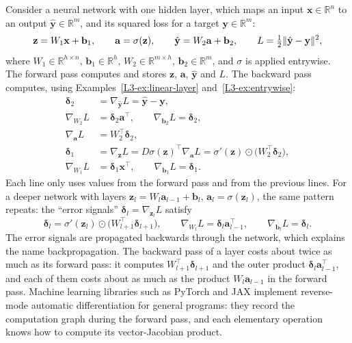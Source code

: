 Consider a neural network with one hidden layer, which maps an input $\mathbf{x} \in \mathbb{R}^n$ to an output $\hat{\mathbf{y}} \in \mathbb{R}^m$, and its squared loss for a target $\mathbf{y} \in \mathbb{R}^m$:
\[\mathbf{z} = W_1 \mathbf{x} + \mathbf{b}_1, \qquad \mathbf{a} = \sigma(\mathbf{z}), \qquad \hat{\mathbf{y}} = W_2 \mathbf{a} + \mathbf{b}_2, \qquad L = \tfrac{1}{2}\lVert \hat{\mathbf{y}} - \mathbf{y} \rVert^2,\]
where $W_1 \in \mathbb{R}^{h \times n}$, $\mathbf{b}_1 \in \mathbb{R}^h$, $W_2 \in \mathbb{R}^{m \times h}$, $\mathbf{b}_2 \in \mathbb{R}^m$, and $\sigma$ is applied entrywise. The forward pass computes and stores $\mathbf{z}$, $\mathbf{a}$, $\hat{\mathbf{y}}$ and $L$. The backward pass computes, using Examples~\ref{L3-ex:linear-layer} and~\ref{L3-ex:entrywise}:
\begin{align*}
    \boldsymbol{\delta}_2 &= \nabla_{\hat{\mathbf{y}}} L = \hat{\mathbf{y}} - \mathbf{y}, \\
    \nabla_{W_2} L &= \boldsymbol{\delta}_2 \mathbf{a}^\top, \qquad \nabla_{\mathbf{b}_2} L = \boldsymbol{\delta}_2, \\
    \nabla_{\mathbf{a}} L &= W_2^\top \boldsymbol{\delta}_2, \\
    \boldsymbol{\delta}_1 &= \nabla_{\mathbf{z}} L = D\sigma(\mathbf{z})^\top \nabla_{\mathbf{a}} L = \sigma'(\mathbf{z}) \odot \big(W_2^\top \boldsymbol{\delta}_2\big), \\
    \nabla_{W_1} L &= \boldsymbol{\delta}_1 \mathbf{x}^\top, \qquad \nabla_{\mathbf{b}_1} L = \boldsymbol{\delta}_1.
\end{align*}
Each line only uses values from the forward pass and from the previous lines. For a deeper network with layers $\mathbf{z}_l = W_l \mathbf{a}_{l-1} + \mathbf{b}_l$, $\mathbf{a}_l = \sigma(\mathbf{z}_l)$, the same pattern repeats: the ``error signals'' $\boldsymbol{\delta}_l = \nabla_{\mathbf{z}_l} L$ satisfy
\[\boldsymbol{\delta}_l = \sigma'(\mathbf{z}_l) \odot \big(W_{l+1}^\top \boldsymbol{\delta}_{l+1}\big), \qquad \nabla_{W_l} L = \boldsymbol{\delta}_l \mathbf{a}_{l-1}^\top, \qquad \nabla_{\mathbf{b}_l} L = \boldsymbol{\delta}_l.\]
The error signals are propagated backwards through the network, which explains the name backpropagation. The backward pass of a layer costs about twice as much as its forward pass: it computes $W_{l+1}^\top\boldsymbol{\delta}_{l+1}$ and the outer product $\boldsymbol{\delta}_l\mathbf{a}_{l-1}^\top$, and each of them costs about as much as the product $W_l\mathbf{a}_{l-1}$ in the forward pass. Machine learning libraries such as PyTorch and JAX implement reverse-mode automatic differentiation for general programs: they record the computation graph during the forward pass, and each elementary operation knows how to compute its vector-Jacobian product.

